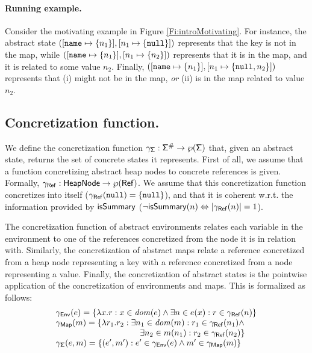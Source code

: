 \paragraph{Running example.} 
Consider the motivating example in Figure \ref{Fi:introMotivating}. For instance, the abstract state $([\mathtt{name} \mapsto \{n_1\}], [n_1 \mapsto \{\mathtt{null}\}])$ represents that the key  is not in the map, while $([\mathtt{name} \mapsto \{n_1\}], [n_1 \mapsto \{n_2\}])$ represents that it is in the map, and it is related to some value $n_2$. Finally, $([\mathtt{name} \mapsto \{n_1\}], [n_1 \mapsto \{\mathtt{null}, n_2\}])$ represents that  (i) might not be in the map, \emph{or} (ii) is in the map related to value $n_2$.

\subsection{Concretization function.}
We define the concretization function $\gamma_{\mathsf{\Sigma}} : \mathsf{\Sigma}^\# \to \wp(\mathsf{\Sigma})$ that, given an abstract state, returns the set of concrete states it represents. First of all, we assume that a function concretizing abstract heap nodes to concrete references is given. Formally, $\gamma_{\mathsf{Ref}} : \mathsf{HeapNode} \to \wp(\mathsf{Ref})$. We assume that this concretization function concretizes  into itself ($\gamma_{\mathsf{Ref}}(\mathtt{null})=\{\mathtt{null}\}$), and that it is coherent w.r.t. the information provided by $\mathsf{isSummary}$ ($\neg \mathsf{isSummary}(n) \Leftrightarrow |\gamma_{\mathsf{Ref}}(n)|=1$).

The concretization function of abstract environments relates each variable in the environment to one of the references concretized from the node it is in relation with. Similarly, the concretization of abstract maps relate a reference concretized from a heap node representing a key with a reference concretized from a node representing a value. Finally, the concretization of abstract states is the pointwise application of the concretization of environments and maps. This is formalized as follows:
\[
\begin{array}{l}
\gamma_\env(e) = \{\lambda x . r : x \in \dom{e} \land \exists n \in e(x) : r \in \gamma_\reference(n)\}\\
\gamma_\map(m) = \{\lambda r_1 . r_2 : \exists n_1 \in \dom{m} : r_1 \in \gamma_\reference(n_1) \land\\
\hspace{100pt} \exists n_2 \in m(n_1) : r_2 \in \gamma_\reference(n_2) \}\\
\gamma_\state(e, m) = \{(e', m') : e' \in \gamma_\env(e) \land m' \in \gamma_\map(m)\}\\
\end{array}
\]


